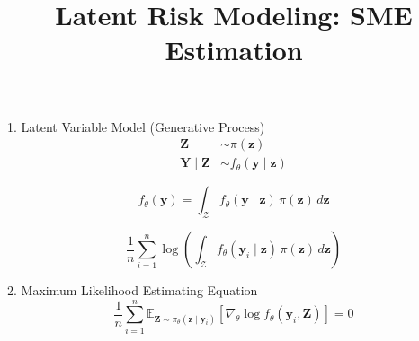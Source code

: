 \documentclass{beamer}
\title{Latent Risk Modeling: SME Estimation}
\author{}
\date{}
\begin{document}
\frame{\titlepage}

\begin{frame}{1. Latent Variable Model (Generative Process)}
\begin{align*}
\mathbf{Z} &\sim \pi(\bm{z}) \\
\mathbf{Y} \mid \mathbf{Z} &\sim f_\theta(\bm{y} \mid \bm{z})
\end{align*}

\begin{equation*}
f_\theta(\bm{y}) = \int_{\mathcal{Z}} f_\theta(\bm{y} \mid \bm{z}) \, \pi(\bm{z}) \, d\bm{z}
\end{equation*}

\begin{equation*}
\frac{1}{n} \sum_{i=1}^n \log \left( \int_{\mathcal{Z}} f_\theta(\bm{y}_i \mid \bm{z}) \, \pi(\bm{z}) \, d\bm{z} \right)
\end{equation*}

\end{frame}

\begin{frame}{2. Maximum Likelihood Estimating Equation}
\begin{equation*}
\frac{1}{n} \sum_{i=1}^n 
\mathbb{E}_{\mathbf{Z} \sim \pi_\theta(\bm{z} \mid \bm{y}_i)} 
\left[
\nabla_\theta \log f_\theta(\bm{y}_i, \mathbf{Z})
\right] = 0
\end{equation*}
\end{frame}
\end{document}
